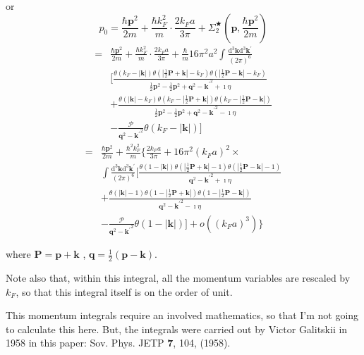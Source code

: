 or
\begin{equation} \label{Eqs2.7.32}
p_0 = \frac{\hbar \mathbf{p}^2}{2m}+\frac{\hbar k_F^2}{m}\cdot\frac{2 k_F a}{3\pi} + \Sigma_2^{\bigstar}(\mathbf{p},\frac{\hbar \mathbf{p}^2}{2m})
\end{equation}
\[ \begin{split}=&\frac{\hbar \mathbf{p}^2}{2m}+\frac{\hbar k_F^2}{m}\cdot\frac{2 k_F a}{3\pi} + \frac{\hbar}{m}16\pi^2 a^2 \int \frac{\mathrm{d}^3 \mathbf{k} \mathrm{d}^3 \mathbf{k}^{'} }{(2\pi)^6} \\
& [  \frac{\theta(k_F-|\mathbf{k}|)\theta(|\frac{1}{2}\mathbf{P}+\mathbf{k}|-k_F)\theta(|\frac{1}{2}\mathbf{P}-\mathbf{k}|-k_F)}{\frac{1}{2}\mathbf{p}^2-\frac{1}{2}\mathbf{p}^2+\mathbf{q}^2-{\mathbf{k}^{'}}^2+\imath \eta} \\
&+ \frac{\theta(|\mathbf{k}|-k_F)\theta(k_F-|\frac{1}{2}\mathbf{P}+\mathbf{k}|)\theta(k_F-|\frac{1}{2}\mathbf{P}-\mathbf{k}|)}{\frac{1}{2}\mathbf{p}^2-\frac{1}{2}\mathbf{p}^2+\mathbf{q}^2-{\mathbf{k}^{'}}^2-\imath \eta}\\
&-\frac{\mathscr{P}}{\mathbf{q}^2-{\mathbf{k}^{'}}^2}\theta(k_F-|\mathbf{k}|) ]
\end{split} \]
\begin{equation} \label{Eqs2.7.33} \begin{split}
=& \frac{\hbar \mathbf{p}^2}{2m} + \frac{\hbar^2 k_F^2}{m} \{ \frac{2 k_F a}{3\pi} + 16 \pi^2 (k_F a)^2 \times\\
&\int \frac{\mathrm{d}^3 \mathbf{k} \mathrm{d}^3 \mathbf{k}^{'} }{(2\pi)^6} [ \frac{\theta(1-|\mathbf{k}|)\theta(|\frac{1}{2}\mathbf{P}+\mathbf{k}|-1)\theta(|\frac{1}{2}\mathbf{P}-\mathbf{k}|-1)}{\mathbf{q}^2-{\mathbf{k}^{'}}^2+\imath \eta} \\
&+ \frac{\theta(|\mathbf{k}|-1)\theta(1-|\frac{1}{2}\mathbf{P}+\mathbf{k}|)\theta(1-|\frac{1}{2}\mathbf{P}-\mathbf{k}|)}{\mathbf{q}^2-{\mathbf{k}^{'}}^2-\imath \eta} \\
&-\frac{\mathscr{P}}{\mathbf{q}^2-{\mathbf{k}^{'}}^2}\theta(1-|\mathbf{k}|) ] + o\left( (k_F a)^3 \right)
\}
\end{split}\end{equation}

where $\mathbf{P}=\mathbf{p}+\mathbf{k}$
, $\mathbf{q}=\frac{1}{2}(\mathbf{p}-\mathbf{k})$.

Note also that, within this integral, all the momentum variables are rescaled by $k_F$, so that this integral itself is on the order of unit.

This momentum integrals require an involved mathematics, so that I'm not going to calculate this here. But, the integrals were carried out by Victor Galitskii in 1958 in this paper: Sov. Phys. JETP $\mathbf{7}$, 104, (1958).

